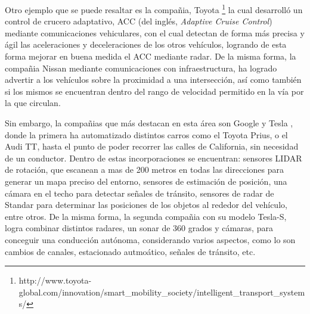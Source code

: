 \par Otro ejemplo que se puede resaltar es la compañia, Toyota \footnote{http://www.toyota-global.com/innovation/smart\_mobility\_society/intelligent\_transport\_systems/} la cual desarrolló un  control de crucero adaptativo, ACC (del inglés, \textit{Adaptive Cruise Control}) mediante comunicaciones vehiculares, con el cual detectan de forma más precisa y ágil las aceleraciones y deceleraciones de los otros vehículos, logrando de esta forma mejorar en buena medida el ACC mediante radar. De la misma forma, la compañia Nissan \cite{VeA} mediante comunicaciones con infraestructura, ha logrado advertir a los vehículos sobre la proximidad a una intersección, así como también si los mismos se encuentran dentro del rango de velocidad permitido en la vía por la que circulan.\\

\par Sin embargo, la compañias que más destacan en esta área son Google \cite{tecnicocentro} y Tesla \cite{palin2012aerodynamic}, donde la primera ha automatizado distintos carros como el Toyota Prius, o el Audi TT, hasta el punto de poder recorrer las calles de California, sin necesidad de un conductor. Dentro de estas incorporaciones se encuentran: sensores LIDAR de rotación, que escanean a mas de 200 metros en todas las direcciones para generar un mapa preciso del entorno, sensores de estimación de posición, una cámara en el techo para detectar señales de tránsito, sensores de radar de Standar para determinar las posiciones de los objetos al rededor del vehículo, entre otros. De la misma forma, la segunda compañia con su modelo Tesla-S, logra combinar distintos radares, un sonar de 360 grados y cámaras, para conceguir una conducción autónoma, considerando varios aspectos, como lo son cambios de canales, estacionado autmoático, señales de tránsito, etc.\\

